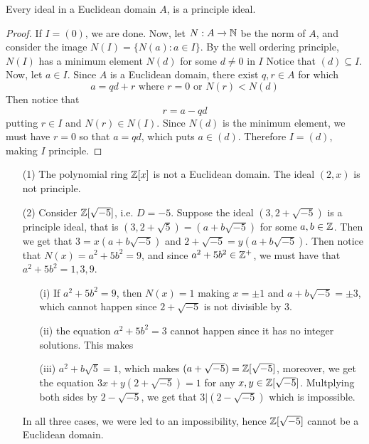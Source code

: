 \begin{lemma}\label{1.5.1}
    Every ideal in a Euclidean domain $A$, is a principle ideal.
\end{lemma}
\begin{proof}
    If $I=(0)$, we are done. Now, let $N:A \xrightarrow{} \mathbb{N}$ be the norm of $A$,
    and consider the image $N(I)=\{N(a) : a \in I\}$. By the well ordering
    principle, $N(I)$ has a minimum element $N(d)$ for some $d \neq 0$ in  $I$
    Notice that  $(d) \subseteq I$. Now, let $a \in I$. Since $A$ is a Euclidean
    domain, there exist $q,r \in A$ for which
    \begin{equation*}
        a=qd+r \text{ where } r=0 \text{ or } N(r)<N(d)
    \end{equation*}
    Then notice that
    \begin{equation*}
        r=a-qd
    \end{equation*}
    putting $r \in I$ and  $N(r) \in N(I)$. Since $N(d)$ is the minimum element,
    we must have $r=0$ so that  $a=qd$, which puts  $a \in (d)$. Therefore
    $I=(d)$, making $I$ principle.
\end{proof}

\begin{example}\label{2.2}
    \begin{enumerate}
        \item[(1)] The polynomial ring $\mathbb{Z}[x]$ is not a Euclidean domain. The
            ideal $(2,x)$ is not principle.

        \item[(2)] Consider $\mathbb{Z}[\sqrt{-5}]$, i.e. $D=-5$. Suppose the ideal
            $(3,2+\sqrt{-5})$ is a principle ideal, that is
            $(3,2+\sqrt{5})=(a+b\sqrt{-5})$ for some $a,b \in \mathbb{Z}$. Then we get
            that $3=x(a+b\sqrt{-5})$ and $2+\sqrt{-5}=y(a+b\sqrt{-5})$. Then
            notice that $N(x)=a^2+5b^2=9$, and since  $a^2+5b^2 \in \mathbb{Z}^+$, we
            must have that $a^2+5b^2=1,3,9$.
            \begin{enumerate}
            \item[(i)] If $a^2+5b^2=9$, then $N(x)=1$ making $x=\pm 1$ and
                $a+b\sqrt{-5}=\pm3$, which cannot happen since $2+\sqrt{-5}$ is
                not divisible by $3$.

            \item[(ii)] the equation $a^2+5b^2=3$ cannot happen since it has no
                integer solutions. This makes

            \item[(iii)] $a^2+b\sqrt{5}=1$, which makes
                $(a+\sqrt{-5})=\mathbb{Z}[\sqrt{-5}]$, moreover, we get the equation
                $3x+y(2+\sqrt{-5})=1$ for any $x,y \in \mathbb{Z}[\sqrt{-5}]$.
                Multplying both sides by $2-\sqrt{-5}$, we get that
                $3|(2-\sqrt{-5})$ which is impossible.
            \end{enumerate}
            In all three cases, we were led to an impossibility, hence
            $\mathbb{Z}[\sqrt{-5}]$ cannot be a Euclidean domain.
    \end{enumerate}
\end{example}

